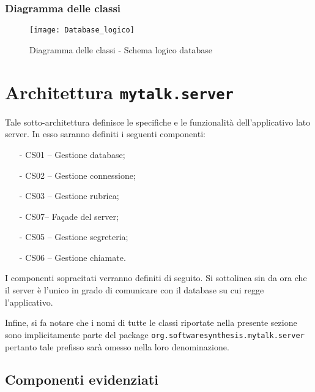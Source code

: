 \subsubsection{Diagramma delle classi}
\begin{figure}[H]
\begin{center}
\texttt{[image: Database\_logico]}
\caption{Diagramma delle classi - Schema logico database}\label{fig:database_logico}
\end{center}
\end{figure}

\clearpage


\section{Architettura \texttt{mytalk.server}}\label{sec:server}
Tale sotto-architettura definisce le specifiche e le funzionalità dell'applicativo lato server. In esso saranno definiti i seguenti componenti:
\begin{itemize}[noitemsep,nolistsep]
	\item[-] \textsf{CS01 -- Gestione database};
	\item[-] \textsf{CS02 -- Gestione connessione};
	\item[-] \textsf{CS03 -- Gestione rubrica};
	\item[-] \textsf{CS07-- Façade del server};
	\item[-] \textsf{CS05 -- Gestione segreteria};
	\item[-] \textsf{CS06 -- Gestione chiamate}.
\end{itemize}

I componenti sopracitati verranno definiti di seguito. Si sottolinea sin da ora che il server è l'unico in grado di comunicare con il database su cui regge l'applicativo.

Infine, si fa notare che i nomi di tutte le classi riportate nella presente sezione sono implicitamente parte del package \texttt{org.softwaresynthesis.mytalk.server} pertanto tale prefisso sarà omesso nella loro denominazione.

\subsection{Componenti evidenziati}

